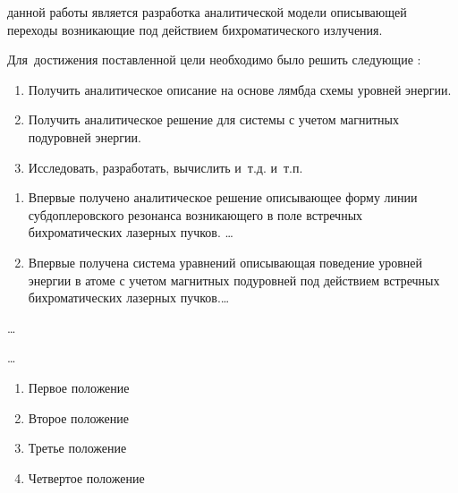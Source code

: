 \ifsynopsis
\else
\fi


{\aim} данной работы является разработка аналитической модели описывающей переходы возникающие под действием бихроматического излучения.

Для~достижения поставленной цели необходимо было решить следующие {\tasks}:
\begin{enumerate}[beginpenalty=10000] %
  \item Получить аналитическое описание на основе лямбда схемы уровней энергии.
  \item Получить аналитическое решение для системы с учетом магнитных подуровней энергии.
  \item Исследовать, разработать, вычислить и~т.\:д. и~т.\:п.
\end{enumerate}

{\novelty}
\begin{enumerate}[beginpenalty=10000] %
  \item Впервые получено аналитическое решение описывающее форму линии субдоплеровского резонанса возникающего в поле встречных бихроматических лазерных пучков. \ldots
  \item Впервые получена система уравнений описывающая поведение уровней энергии в атоме с учетом магнитных подуровней под действием встречных бихроматических лазерных пучков.\ldots
\end{enumerate}

{\influence} \ldots

{\methods} \ldots

{}
\begin{enumerate}[beginpenalty=10000] %
  \item Первое положение
  \item Второе положение
  \item Третье положение
  \item Четвертое положение
\end{enumerate}

